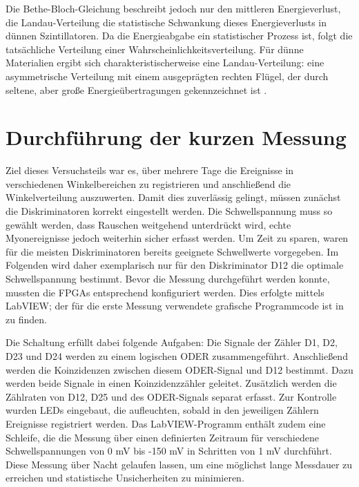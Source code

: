 Die Bethe-Bloch-Gleichung beschreibt jedoch nur den mittleren Energieverlust, die Landau-Verteilung die statistische Schwankung dieses Energieverlusts in dünnen Szintillatoren. Da die Energieabgabe ein statistischer Prozess ist, folgt die tatsächliche Verteilung einer Wahrscheinlichkeitsverteilung. Für dünne Materialien ergibt sich charakteristischerweise eine Landau-Verteilung: eine asymmetrische Verteilung mit einem ausgeprägten rechten Flügel, der durch seltene, aber große Energieübertragungen gekennzeichnet ist \cite{Wermes}.

\section{Durchführung der kurzen Messung}
Ziel dieses Versuchsteils war es, über mehrere Tage die Ereignisse in verschiedenen Winkelbereichen zu registrieren und anschließend die Winkelverteilung auszuwerten. Damit dies zuverlässig gelingt, müssen zunächst die Diskriminatoren korrekt eingestellt werden. Die Schwellspannung muss so gewählt werden, dass Rauschen weitgehend unterdrückt wird, echte Myonereignisse jedoch weiterhin sicher erfasst werden. Um Zeit zu sparen, waren für die meisten Diskriminatoren bereits geeignete Schwellwerte vorgegeben. Im Folgenden wird daher exemplarisch nur für den Diskriminator D12 die optimale Schwellspannung bestimmt.
Bevor die Messung durchgeführt werden konnte, mussten die FPGAs entsprechend konfiguriert werden. Dies erfolgte mittels LabVIEW; der für die erste Messung verwendete grafische Programmcode ist in \cite{AriehT_518} zu finden.

Die Schaltung erfüllt dabei folgende Aufgaben:
Die Signale der Zähler D1, D2, D23 und D24 werden zu einem logischen ODER zusammengeführt. Anschließend werden die Koinzidenzen zwischen diesem ODER-Signal und D12 bestimmt. Dazu werden beide Signale in einen Koinzidenzzähler geleitet. Zusätzlich werden die Zählraten von D12, D25 und des ODER-Signals separat erfasst. Zur Kontrolle wurden LEDs eingebaut, die aufleuchten, sobald in den jeweiligen Zählern Ereignisse registriert werden.
Das LabVIEW-Programm enthält zudem eine Schleife, die die Messung über einen definierten Zeitraum für verschiedene Schwellspannungen von 0 mV bis -150 mV in Schritten von 1 mV durchführt. Diese Messung über Nacht gelaufen lassen, um eine möglichst lange Messdauer zu erreichen und statistische Unsicherheiten zu minimieren.

